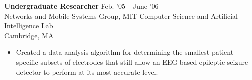 \documentclass[margin]{res}
\begin{document}
\begin{resume}
% 
  {\bf Undergraduate Researcher} \hfill Feb. '05 - June '06 \\ Networks and Mobile Systems Group, MIT Computer Science and Artificial Intelligence Lab \\ Cambridge, MA 
 \begin{itemize} \itemsep -2pt  %
\item Created a data-analysis algorithm for determining the smallest patient-specific subsets of electrodes that still allow an EEG-based epileptic seizure detector to perform at its most accurate level. 
\end{itemize}
 
 
 


 
%		 
		

\end{resume}
\end{document}
